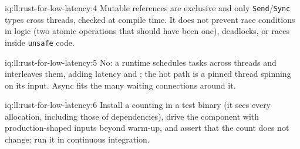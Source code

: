 \begin{solution}{iq:ll:rust-for-low-latency:4}
Mutable references are exclusive and only \texttt{Send}/\texttt{Sync} types cross threads, checked at compile time. It does
not prevent race conditions in logic (two atomic operations that should have been one), deadlocks, or races inside
\texttt{unsafe} code.
\end{solution}

\begin{solution}{iq:ll:rust-for-low-latency:5}
No: a runtime schedules tasks across threads and interleaves them, adding latency and ; the hot path is a pinned
thread spinning on its input. Async fits the many waiting connections around it.
\end{solution}

\begin{solution}{iq:ll:rust-for-low-latency:6}
Install a counting  in a test binary (it sees every allocation, including those of dependencies), drive the
component with production-shaped inputs beyond warm-up, and assert that the count does not change; run it in continuous
integration.
\end{solution}
